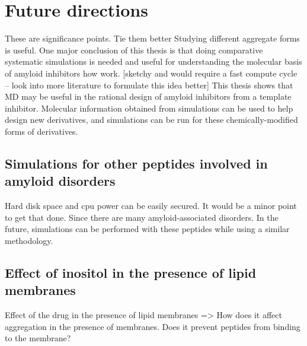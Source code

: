 %
%
%

\section{Future directions}

These are significance points.  Tie them better Studying different aggregate forms is useful.  One major conclusion of this thesis is that doing comparative systematic simulations is needed and useful for understanding the molecular basis of amyloid inhibitors how work.
[sketchy and would require a fast compute cycle -- look into more literature to formulate this idea better] This thesis shows that MD may be useful in the rational design of amyloid inhibitors from a template inhibitor. Molecular information obtained from simulations can be used to help design new derivatives, and simulations can be run for these chemically-modified forms of derivatives. 

\subsection{Simulations for other peptides involved in amyloid disorders}
Hard disk space and cpu power can be easily secured.  It would be a minor point to get that done.  Since there are many amyloid-associated disorders. In the future, simulations can be performed with these peptides while using a similar methodology. 

\subsection{Effect of inositol in the presence of lipid membranes}
Effect of the drug in the presence of lipid membranes => How does it affect aggregation in the presence of membranes. Does it prevent peptides from binding to the membrane?

